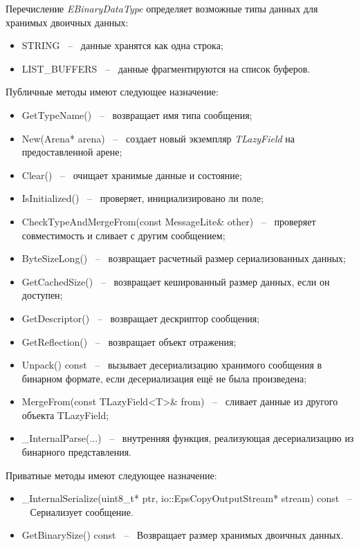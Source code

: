 Перечисление \textit{EBinaryDataType} определяет возможные типы данных для хранимых двоичных данных:
\begin{itemize}
    \item STRING ~--~ данные хранятся как одна строка;
    \item LIST\_BUFFERS ~--~ данные фрагментируются на список буферов.
\end{itemize}

Публичные методы имеют следующее назначение:
\begin{itemize}
    \item GetTypeName() ~--~ возвращает имя типа сообщения;
    \item New(Arena* arena) ~--~ создает новый экземпляр \textit{TLazyField} на предоставленной арене;
    \item Clear() ~--~ очищает хранимые данные и состояние;
    \item IsInitialized() ~--~ проверяет, инициализировано ли поле;
    \item CheckTypeAndMergeFrom(const MessageLite\& other) ~--~ проверяет совместимость и сливает с другим сообщением;
    \item ByteSizeLong() ~--~ возвращает расчетный размер сериализованных данных;
    \item GetCachedSize() ~--~ возвращает кешированный размер данных, если он доступен;
    \item GetDescriptor() ~--~ возвращает дескриптор сообщения;
    \item GetReflection() ~--~ возвращает объект отражения;
    \item Unpack() const ~--~ вызывает десериализацию хранимого сообщения в бинарном формате, если десериализация ещё не была произведена;
    \item MergeFrom(const TLazyField<T>\& from) ~--~ сливает данные из другого объекта TLazyField;
    \item \_InternalParse(...) ~--~ внутренняя функция, реализующая десериализацию из бинарного представления.
\end{itemize}

Приватные методы имеют следующее назначение:

\begin{itemize}
    \item \_InternalSerialize(uint8\_t* ptr, io::EpsCopyOutputStream* stream) const ~--~ Сериализует сообщение.
    \item GetBinarySize() const ~--~ Возвращает размер хранимых двоичных данных.
\end{itemize}

